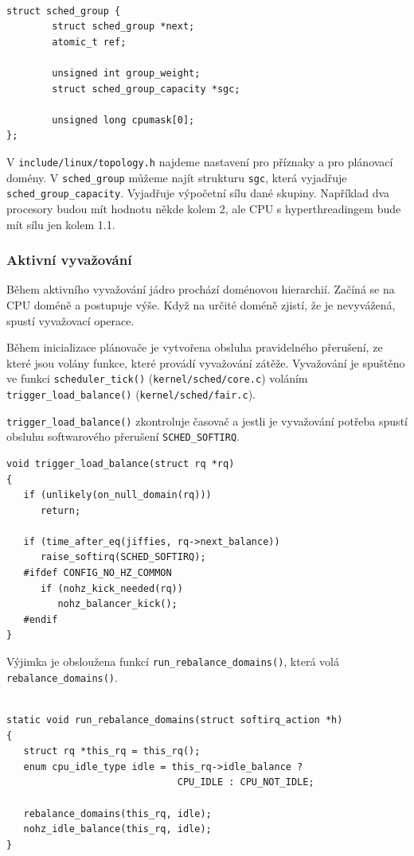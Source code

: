 \documentclass[
  master=true,
  font=sans,
  printversion=false,
  joinlists=true,
  figures=true,
  tables=true,
  sourcecodes=false,
  theorems=false,
  bibencoding=utf8,
  language=czech,
  encoding=utf8,
  field=ainfk,
  biblatex,
  glossaries,
  index
]{kidiplom}
\begin{document}
\begin{verbatim} 

struct sched_group {
        struct sched_group *next;
        atomic_t ref;

        unsigned int group_weight;
        struct sched_group_capacity *sgc;

        unsigned long cpumask[0];
};

\end{verbatim} 

V \verb#include/linux/topology.h# najdeme nastavení pro příznaky a pro plánovací domény. V \verb#sched_group# můžeme najít strukturu \verb#sgc#, která vyjadřuje \verb#sched_group_capacity#. Vyjadřuje výpočetní sílu dané skupiny. Například dva procesory budou mít hodnotu někde kolem 2, ale CPU s hyperthreadingem bude mít sílu jen kolem 1.1. 

\subsubsection{Aktivní vyvažování}

Během aktivního vyvažování jádro prochází doménovou hierarchií. Začíná se na CPU doméně a postupuje výše. Když na určité doméně zjistí, že je nevyvážená, spustí vyvažovací operace.

Během inicializace plánovače je vytvořena obsluha pravidelného přerušení, ze které jsou volány funkce, které provádí vyvažování zátěže. Vyvažování je spuštěno ve funkci \verb#scheduler_tick()# (\verb#kernel/sched/core.c#) voláním \linebreak \verb#trigger_load_balance()# (\verb#kernel/sched/fair.c#). 

\verb#trigger_load_balance()# zkontroluje časovač a jestli je vyvažování potřeba spustí obsluhu softwarového přerušení \verb#SCHED_SOFTIRQ#.

\newpage
\begin{verbatim} 
void trigger_load_balance(struct rq *rq)
{
   if (unlikely(on_null_domain(rq)))
      return;

   if (time_after_eq(jiffies, rq->next_balance))
      raise_softirq(SCHED_SOFTIRQ);
   #ifdef CONFIG_NO_HZ_COMMON
      if (nohz_kick_needed(rq))
         nohz_balancer_kick();
   #endif
}
\end{verbatim} 

Výjimka je obsloužena funkcí \verb#run_rebalance_domains()#, která volá \linebreak \verb#rebalance_domains()#. 

\begin{verbatim} 

static void run_rebalance_domains(struct softirq_action *h)
{
   struct rq *this_rq = this_rq();
   enum cpu_idle_type idle = this_rq->idle_balance ?
                              CPU_IDLE : CPU_NOT_IDLE;

   rebalance_domains(this_rq, idle);
   nohz_idle_balance(this_rq, idle);
}

\end{verbatim} 
\end{document}
